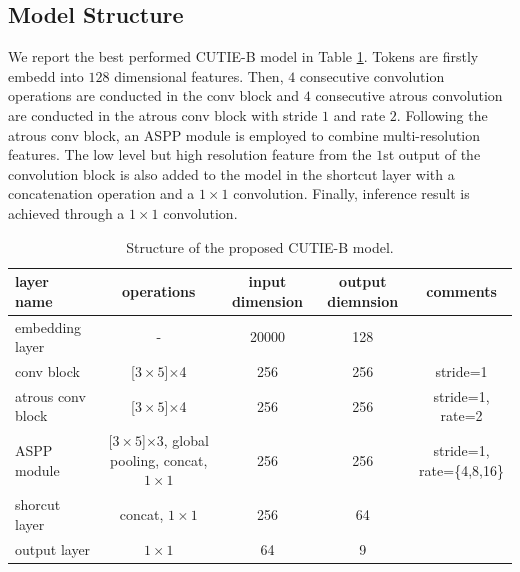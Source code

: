 \documentclass[10pt,twocolumn,letterpaper]{article}
\begin{document}
\subsection{Model Structure}
We report the best performed CUTIE-B model in Table \ref{tab:cutie}. Tokens are firstly embedd into $128$ dimensional features. Then, $4$ consecutive convolution operations are conducted in the conv block and $4$ consecutive atrous convolution are conducted in the atrous conv block with stride $1$ and rate $2$. Following the atrous conv block, an ASPP module is employed to combine multi-resolution features. The low level but high resolution feature from the $1$st output of the convolution block is also added to the model in the shortcut layer with a concatenation operation and a $1\times1$ convolution. Finally, inference result is achieved through a $1\times1$ convolution.
\begin{table}
	\caption{Structure of the proposed CUTIE-B model. }
\begin{center}
\begin{tabular}{l | c | c | c | c}
	layer name & operations & input dimension & output diemnsion & comments \\
	\hline
	embedding layer & - & 20000 & 128 & \\
	conv block & [$3\times5$]$\times$4 & 256 & 256 & stride=1 \\
	atrous conv block & [$3\times5$]$\times$4 & 256 & 256 & stride=1, rate=2 \\
	ASPP module & [$3\times5$]$\times$3, global pooling, concat, $1\times1$ & 256 & 256 & stride=1, rate=\{4,8,16\} \\
	shorcut layer & concat, $1\times1$ & 256 & 64 & \\
	output layer & $1\times1$ & 64 & 9 & \\ 
\end{tabular}
\end{center}
	\label{tab:cutie}
\end{table}
\end{document}
